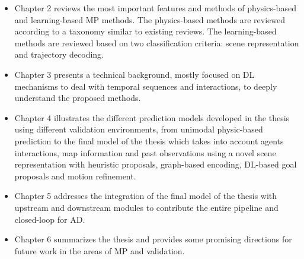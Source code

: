 \begin{itemize}
	\item Chapter 2 reviews the most important features and methods of physics-based and learning-based \ac{MP} methods. The physics-based methods are reviewed according to a taxonomy similar to existing reviews. The learning-based methods are reviewed based on two classification criteria: scene representation and trajectory decoding.
	\item Chapter 3 presents a technical background, mostly focused on \ac{DL} mechanisms to deal with temporal sequences and interactions, to deeply understand the proposed methods.
	\item Chapter 4 illustrates the different prediction models developed in the thesis using different validation environments, from unimodal physic-based prediction to the final model of the thesis which takes into account agents interactions, map information and past observations using a novel scene representation with heuristic proposals, graph-based encoding, \ac{DL}-based goal proposals and motion refinement.
	\item Chapter 5 addresses the integration of the final model of the thesis with upstream and downstream modules to contribute the entire pipeline and closed-loop for \ac{AD}.
	\item Chapter 6 summarizes the thesis and provides some promising directions for future work in the areas of \ac{MP} and validation.
\end{itemize}
